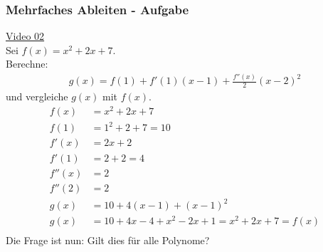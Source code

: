 \subsubsection{Mehrfaches Ableiten - Aufgabe}
\href{https://youtu.be/1SbIqyzxLeg}{Video 02}\\
Sei $ f(x)=x^2+2x+7 $.\\
Berechne:\\
\begin{align*}
g(x)=f(1)+f'(1)(x-1)+\frac{f''(x)}{2}(x-2)^2
\end{align*}
und vergleiche $ g(x) $ mit $ f(x) $.\\
\begin{align*}
f(x)&=x^2+2x+7\\
f(1)&=1^2+2+7=10\\
f'(x)&=2x+2\\
f'(1)&=2+2=4\\
f''(x)&=2\\
f''(2)&=2\\
g(x)&=10+4(x-1)+(x-1)^2\\
g(x)&=10+4x-4+x^2-2x+1=x^2+2x+7=f(x)\\
\end{align*}
Die Frage ist nun: Gilt dies für alle Polynome?\\
